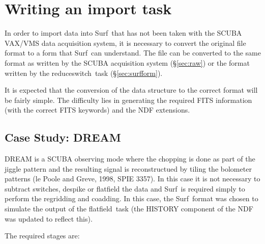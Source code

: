 \documentclass[twoside,11pt]{article}
\newcommand{\task}[1]{{\sf #1}}
\newcommand{\resw}{\xref{\task{reduce\_switch}}{sun216}{REDUCE_SWITCH}}
\newcommand{\flatf}{\xref{\task{flatfield}}{sun216}{FLATFIELD}}
\newcommand{\scusoft}          {{\sc Surf}}
\newcommand{\xref}[3]{#1}
\renewcommand{\_}{\texttt{\symbol{95}}}
\begin{document}
\section{Writing an import task}

In order to import data into \scusoft\ that has not been taken with the
SCUBA VAX/VMS data acquisition system, it is necessary to convert the
original file format to a form that \scusoft\ can understand.
The file can be converted to the same format as written by the SCUBA
acquisition system (\S\ref{sec:raw}) or the format written by the
\resw\ task (\S\ref{sec:surfform}).

It is expected that the conversion of the data structure to the correct format 
will be fairly simple. The difficulty lies in generating the required FITS
information (with the correct FITS keywords) and the NDF extensions.

\subsection{Case Study: DREAM}

DREAM is a SCUBA observing mode where the chopping is done as part of the
jiggle pattern and the resulting signal is reconstructued by tiling the
bolometer patterns (le Poole and Greve, 1998, SPIE 3357). In this case
it is not necessary to subtract switches, despike or flatfield the data and
\scusoft\ is required simply to perform the regridding and coadding.
In this case, the \scusoft\ format was chosen to simulate the output of the
\flatf\ task (the HISTORY component of the NDF was updated to reflect this).

The required stages are:
\end{document}
